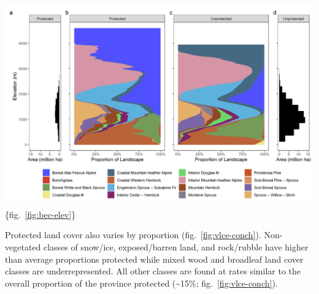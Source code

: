 \documentclass[11pt]{article}
\makeatletter
\def\maxwidth{\ifdim\Gin@nat@width>\linewidth\linewidth
\else\Gin@nat@width\fi}
\let\Oldincludegraphics\includegraphics
\renewcommand{\includegraphics}[1]{\Oldincludegraphics[width=\maxwidth]{#1}}
\makeatother
\begin{document}
\includegraphics{figures/bec_elev_hist.png}\{fig.~\ref{fig:bec-elev}\}

Protected land cover also varies by proportion
(fig.~\ref{fig:vlce-conch}). Non-vegetated classes of snow/ice,
exposed/barren land, and rock/rubble have higher than average
proportions protected while mixed wood and broadleaf land cover classes
are underrepresented. All other classes are found at rates similar to
the overall proportion of the province protected (\textasciitilde15\%;
fig.~\ref{fig:vlce-conch}).
\end{document}
